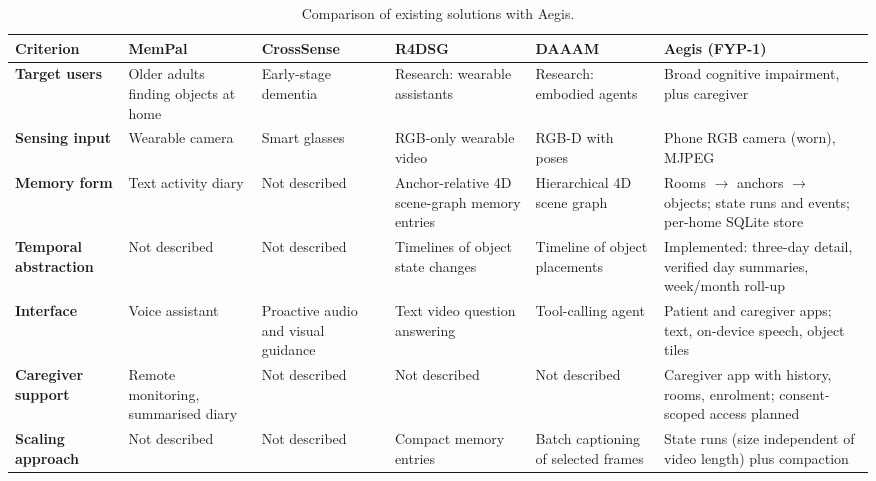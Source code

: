 \begin{table}[H]
\centering\scriptsize
\setlength{\tabcolsep}{3pt}
\caption{Comparison of existing solutions with Aegis.}
\label{tab:comparison}
\begin{tabularx}{\textwidth}{@{}>{\bfseries}L{1.9cm} Y Y Y Y Y@{}}
\toprule
{}\textbf{Criterion} & \textbf{MemPal \cite{mempal2025}} &
\textbf{CrossSense} & \textbf{R4DSG \cite{r4dsg2026}} &
\textbf{DAAAM \cite{daaam2026}} & \textbf{Aegis (FYP-1)}\\
\midrule
Target users & Older adults finding objects at home & Early-stage dementia &
Research: wearable assistants & Research: embodied agents & Broad cognitive
impairment, plus caregiver\\
Sensing input & Wearable camera & Smart glasses & RGB-only wearable video &
RGB-D with poses & Phone RGB camera (worn), MJPEG\\
Memory form & Text activity diary & Not described & Anchor-relative 4D
scene-graph memory entries & Hierarchical 4D scene graph & Rooms $\rightarrow$ anchors $\rightarrow$ objects; state runs and events; per-home SQLite store\\
Temporal abstraction & Not described & Not described & Timelines of object
state changes & Timeline of object placements & Implemented: three-day detail, verified day summaries, week/month roll-up\\
Interface & Voice assistant & Proactive audio and visual guidance & Text video
question answering & Tool-calling agent & Patient and caregiver apps; text, on-device speech, object tiles\\
Caregiver support & Remote monitoring, summarised diary & Not described &
Not described & Not described & Caregiver app with history, rooms, enrolment; consent-scoped access planned\\
Scaling approach & Not described & Not described & Compact memory entries &
Batch captioning of selected frames & State runs (size independent of video length) plus compaction\\
\bottomrule
\end{tabularx}
\end{table}

